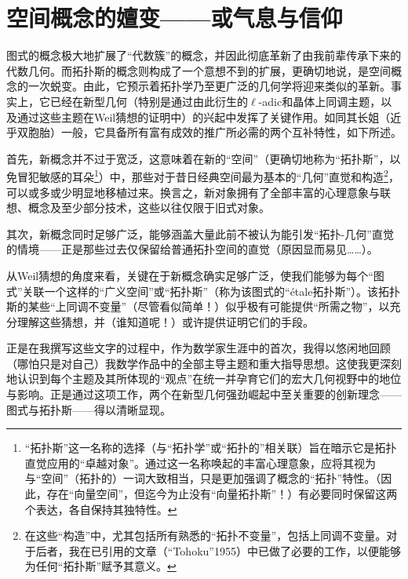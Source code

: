 
\section{空间概念的嬗变——或气息与信仰}

图式的概念极大地扩展了“代数簇”的概念，并因此彻底革新了由我前辈传承下来的代数几何。而拓扑斯的概念则构成了一个意想不到的扩展，更确切地说，是空间概念的一次蜕变。由此，它预示着拓扑学乃至更广泛的几何学将迎来类似的革新。事实上，它已经在新型几何（特别是通过由此衍生的$\ell$-adic和晶体上同调主题，以及通过这些主题在Weil猜想的证明中）的兴起中发挥了关键作用。如同其长姐（近乎双胞胎）一般，它具备所有富有成效的推广所必需的两个互补特性，如下所述。

首先，新概念并不过于宽泛，这意味着在新的“空间”（更确切地称为“拓扑斯”，以免冒犯敏感的耳朵\footnote{“拓扑斯”这一名称的选择（与“拓扑学”或“拓扑的”相关联）旨在暗示它是拓扑直觉应用的“卓越对象”。通过这一名称唤起的丰富心理意象，应将其视为与“空间”（拓扑的）一词大致相当，只是更加强调了概念的“拓扑”特性。（因此，存在“向量空间”，但迄今为止没有“向量拓扑斯”！）有必要同时保留这两个表达，各自保持其独特性。}）中，那些对于昔日经典空间最为基本的“几何”直觉和构造\footnote{在这些“构造”中，尤其包括所有熟悉的“拓扑不变量”，包括上同调不变量。对于后者，我在已引用的文章（“Tohoku”1955）中已做了必要的工作，以便能够为任何“拓扑斯”赋予其意义。}，可以或多或少明显地移植过来。换言之，新对象拥有了全部丰富的心理意象与联想、概念及至少部分技术，这些以往仅限于旧式对象。

其次，新概念同时足够广泛，能够涵盖大量此前不被认为能引发“拓扑-几何”直觉的情境——正是那些过去仅保留给普通拓扑空间的直觉（原因显而易见……）。

从Weil猜想的角度来看，关键在于新概念确实足够广泛，使我们能够为每个“图式”关联一个这样的“广义空间”或“拓扑斯”（称为该图式的“étale拓扑斯”）。该拓扑斯的某些“上同调不变量”（尽管看似简单！）似乎极有可能提供“所需之物”，以充分理解这些猜想，并（谁知道呢！）或许提供证明它们的手段。

正是在我撰写这些文字的过程中，作为数学家生涯中的首次，我得以悠闲地回顾（哪怕只是对自己）我数学作品中的全部主导主题和重大指导思想。这使我更深刻地认识到每个主题及其所体现的“观点”在统一并孕育它们的宏大几何视野中的地位与影响。正是通过这项工作，两个在新型几何强劲崛起中至关重要的创新理念——图式与拓扑斯——得以清晰显现。

